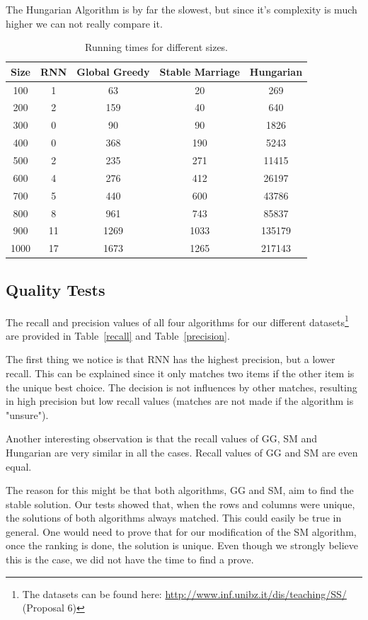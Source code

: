 \documentclass[a4paper,11pt]{article}
\begin{document}
The Hungarian Algorithm is by far the slowest, but since it's complexity is much higher we can not really compare it.

\begin{table}[tbh]
\centering
\begin{tabular}{|c|c|c|c|c|}
\hline 
Size & RNN & Global Greedy & Stable Marriage & Hungarian \tabularnewline
\hline 
\hline 
 100 & 1 & 63 & 20 & 269\tabularnewline
\hline
 200 & 2 & 159 & 40 & 640\tabularnewline
\hline 
 300 & 0 & 90 & 90 & 1826\tabularnewline
\hline 
 400 & 0 & 368 & 190 & 5243\tabularnewline
\hline 
 500 & 2 & 235 & 271 & 11415\tabularnewline
\hline 
 600 & 4 & 276 & 412 & 26197\tabularnewline
\hline 
 700 & 5 & 440 & 600 & 43786\tabularnewline
\hline
 800 & 8 & 961 & 743 & 85837\tabularnewline
\hline 
 900 & 11 & 1269 & 1033 & 135179\tabularnewline
\hline
 1000 & 17 & 1673 & 1265 & 217143\tabularnewline
\hline 
\end{tabular}
\caption{Running times for different sizes.}
\label{runtimes}
\end{table}

\subsection{Quality Tests}

The recall and precision values of all four algorithms for our different datasets\footnote{The datasets can be found here: \url{http://www.inf.unibz.it/dis/teaching/SS/} (Proposal 6)} are provided in Table~\ref{recall} and Table~\ref{precision}. 

The first thing we notice is that RNN has the highest precision, but a lower recall. This can be explained since it only matches two items if the other item is the unique best choice. The decision is not influences by other matches, resulting in high precision but low recall values (matches are not made if the algorithm is "unsure").

Another interesting observation is that the recall values of GG, SM and Hungarian are very similar in all the cases. Recall values of GG and SM are even equal. %

The reason for this might be that both algorithms, GG and SM, aim to find the stable solution. Our tests showed that, when the rows and columns were unique, the solutions of both algorithms always matched. This could easily be true in general. One would need to prove that for our modification of the SM algorithm, once the ranking is done, the solution is unique. Even though we strongly believe this is the case, we did not have the time to find a prove.
\end{document}
